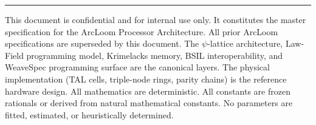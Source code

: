 \documentclass[11pt, a4paper]{report}
\begin{document}
\vspace{2em}
\hrule
\vspace{0.5em}
{\color{al-gray}\small This document is confidential and for internal use only.
It constitutes the master specification for the ArcLoom Processor
Architecture. All prior ArcLoom specifications are superseded by this
document. The $\psi$-lattice architecture, Law-Field programming model,
Krimelacks memory, BSIL interoperability, and WeaveSpec programming
surface are the canonical layers. The physical implementation (TAL cells,
triple-node rings, parity chains) is the reference hardware design. All
mathematics are deterministic. All constants are frozen rationals or
derived from natural mathematical constants. No parameters are fitted,
estimated, or heuristically determined.}
\end{document}
